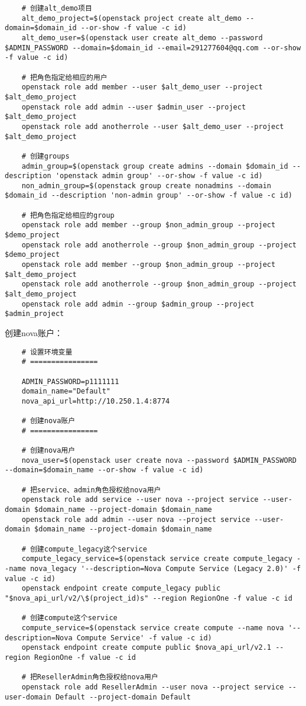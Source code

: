 \documentclass[a4paper,left=1.5cm,right=1.5cm,11pt]{article}
\begin{document}
\begin{lstlisting}
	# 创建alt_demo项目
	alt_demo_project=$(openstack project create alt_demo --domain=$domain_id --or-show -f value -c id)
	alt_demo_user=$(openstack user create alt_demo --password $ADMIN_PASSWORD --domain=$domain_id --email=291277604@qq.com --or-show -f value -c id)
	
	# 把角色指定给相应的用户
	openstack role add member --user $alt_demo_user --project $alt_demo_project
	openstack role add admin --user $admin_user --project $alt_demo_project
	openstack role add anotherrole --user $alt_demo_user --project $alt_demo_project
	
	# 创建groups
	admin_group=$(openstack group create admins --domain $domain_id --description 'openstack admin group' --or-show -f value -c id)
	non_admin_group=$(openstack group create nonadmins --domain $domain_id --description 'non-admin group' --or-show -f value -c id)
	
	# 把角色指定给相应的group
	openstack role add member --group $non_admin_group --project $demo_project
	openstack role add anotherrole --group $non_admin_group --project $demo_project
	openstack role add member --group $non_admin_group --project $alt_demo_project
	openstack role add anotherrole --group $non_admin_group --project $alt_demo_project	
	openstack role add admin --group $admin_group --project $admin_project
	\end{lstlisting}

	创建nova账户：
	\begin{lstlisting}
	# 设置环境变量
	# ================

	ADMIN_PASSWORD=p1111111
	domain_name="Default"
	nova_api_url=http://10.250.1.4:8774

	# 创建nova账户
	# ================

	# 创建nova用户
	nova_user=$(openstack user create nova --password $ADMIN_PASSWORD --domain=$domain_name --or-show -f value -c id)
	
	# 把service、admin角色授权给nova用户
	openstack role add service --user nova --project service --user-domain $domain_name --project-domain $domain_name
	openstack role add admin --user nova --project service --user-domain $domain_name --project-domain $domain_name
	
	# 创建compute_legacy这个service
	compute_legacy_service=$(openstack service create compute_legacy --name nova_legacy '--description=Nova Compute Service (Legacy 2.0)' -f value -c id)
	openstack endpoint create compute_legacy public "$nova_api_url/v2/\$(project_id)s" --region RegionOne -f value -c id
	
	# 创建compute这个service
	compute_service=$(openstack service create compute --name nova '--description=Nova Compute Service' -f value -c id)
	openstack endpoint create compute public $nova_api_url/v2.1 --region RegionOne -f value -c id
	
	# 把ResellerAdmin角色授权给nova用户
	openstack role add ResellerAdmin --user nova --project service --user-domain Default --project-domain Default
	\end{lstlisting}
\end{document}
